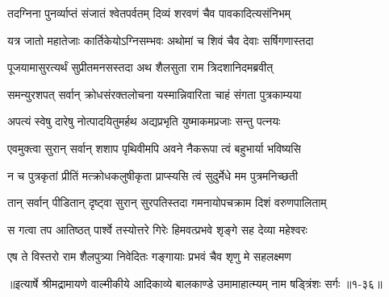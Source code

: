 \twolineshloka
{तदग्निना पुनर्व्याप्तं संजातं श्वेतपर्वतम्}
{दिव्यं शरवणं चैव पावकादित्यसंनिभम्} %

\twolineshloka
{यत्र जातो महातेजाः कार्तिकेयोऽग्निसम्भवः}
{अथोमां च शिवं चैव देवाः सर्षिगणास्तदा} %

\twolineshloka
{पूजयामासुरत्यर्थं सुप्रीतमनसस्तदा}
{अथ शैलसुता राम त्रिदशानिदमब्रवीत्} %

\twolineshloka
{समन्युरशपत् सर्वान् क्रोधसंरक्तलोचना}
{यस्मान्निवारिता चाहं संगता पुत्रकाम्यया} %

\twolineshloka
{अपत्यं स्वेषु दारेषु नोत्पादयितुमर्हथ}
{अद्यप्रभृति युष्माकमप्रजाः सन्तु पत्नयः} %

\twolineshloka
{एवमुक्त्वा सुरान् सर्वान् शशाप पृथिवीमपि}
{अवने नैकरूपा त्वं बहुभार्या भविष्यसि} %

\twolineshloka
{न च पुत्रकृतां प्रीतिं मत्क्रोधकलुषीकृता}
{प्राप्स्यसि त्वं सुदुर्मेधे मम पुत्रमनिच्छती} %

\twolineshloka
{तान् सर्वान् पीडितान् दृष्ट्वा सुरान् सुरपतिस्तदा}
{गमनायोपचक्राम दिशं वरुणपालिताम्} %

\twolineshloka
{स गत्वा तप आतिष्ठत् पार्श्वे तस्योत्तरे गिरेः}
{हिमवत्प्रभवे शृङ्गे सह देव्या महेश्वरः} %

\twolineshloka
{एष ते विस्तरो राम शैलपुत्र्या निवेदितः}
{गङ्गायाः प्रभवं चैव शृणु मे सहलक्ष्मण} %


॥इत्यार्षे श्रीमद्रामायणे वाल्मीकीये आदिकाव्ये बालकाण्डे उमामाहात्म्यम् नाम षड्त्रिंशः सर्गः ॥१-३६॥

